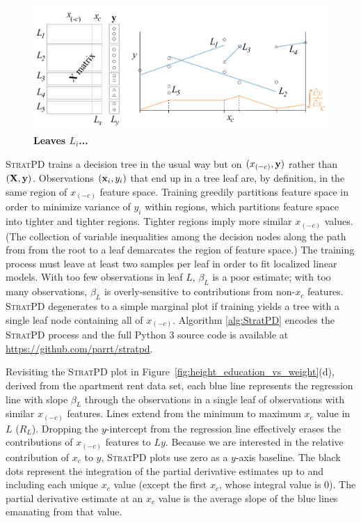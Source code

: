 \documentclass[12pt]{article}
\newcommand{\figref}[1]{Figure~\ref{#1}}
\newcommand{\spd}{\fontfamily{cmr}\textsc{\small StratPD}}
\newcommand{\xnc}{$x_{(-c)}$}
\begin{document}
\begin{figure}[htbp]
\begin{center}
\includegraphics[scale=0.7]{images/leaves.pdf}
\caption{{\bf  Leaves $L_i$...}}
\label{fig:leaves}
\end{center}
\end{figure}

\spd{} trains a decision tree in the usual way but on $(x_{(-c)}, {\bf y})$ rather than $({\bf X}, {\bf y})$. Observations $({\bf x}_{i}, y_i)$ that end up in a tree leaf are, by definition, in the same region of \xnc{} feature space. Training greedily partitions feature space in order to minimize variance of $y_i$ within regions, which partitions feature space into tighter and tighter regions.  Tighter regions imply more similar \xnc{} values. (The collection of variable inequalities among the decision nodes along the path from from the root to a leaf demarcates the region of feature space.)  The training process must leave at least two samples per leaf in order to fit localized linear models. With too few observations in leaf $L$, $\beta_L$ is a poor estimate; with too many observations, $\beta_L$ is overly-sensitive to contributions from non-$x_c$ features. \spd{} degenerates to a simple marginal plot if training yields a tree with a single leaf node containing all of \xnc{}.  Algorithm \ref{alg:StratPD} encodes the \spd{} process and the full Python 3 source code is available at {\small \url{https://github.com/parrt/stratpd}}.

Revisiting the \spd{} plot in \figref{fig:height_education_vs_weight}(d), derived from the apartment rent data set, each blue line represents the regression line with slope $\beta_L$ through the observations in a single leaf of observations with similar \xnc{} features. Lines extend from the minimum to maximum $x_c$ value in $L$ ($R_L$). Dropping the $y$-intercept from the regression line effectively erases the contributions of \xnc{} features to $Ly$. Because we are interested in the relative contribution of $x_c$ to $y$, \spd{} plots use zero as a $y$-axis baseline. The black dots represent the integration of the partial derivative estimates up to and including each unique $x_c$ value (except the first $x_c$, whose integral value is 0). The partial derivative estimate at an $x_c$ value is the average slope of the blue lines emanating from that value.  
\end{document}
